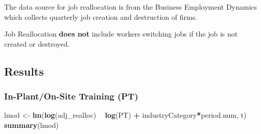 \documentclass[
]{article}
\newenvironment{Shaded}{\begin{snugshade}}{\end{snugshade}}
\newcommand{\KeywordTok}[1]{\textcolor[rgb]{0.13,0.29,0.53}{\textbf{#1}}}
\newcommand{\NormalTok}[1]{#1}
\newcommand{\OperatorTok}[1]{\textcolor[rgb]{0.81,0.36,0.00}{\textbf{#1}}}
\newcommand{\StringTok}[1]{\textcolor[rgb]{0.31,0.60,0.02}{#1}}
\begin{document}
The data source for job reallocation is from the Business Employment
Dynamics which collects quarterly job creation and destruction of firms.

Job Reallocation \textbf{does not} include workers switching jobs if the
job is not created or destroyed.

\hypertarget{results}{%
\subsection{Results}\label{results}}

\hypertarget{in-planton-site-training-pt}{%
\subsubsection{In-Plant/On-Site Training
(PT)}\label{in-planton-site-training-pt}}

\begin{Shaded}
\begin{Highlighting}[]
\NormalTok{lmod <-}\StringTok{ }\KeywordTok{lm}\NormalTok{(}\KeywordTok{log}\NormalTok{(adj_realloc) }\OperatorTok{~}\StringTok{  }\KeywordTok{log}\NormalTok{(PT) }\OperatorTok{+}\StringTok{ }\NormalTok{industryCategory}\OperatorTok{*}\NormalTok{period.num, t)}
\KeywordTok{summary}\NormalTok{(lmod)}
\end{Highlighting}
\end{Shaded}
\end{document}
